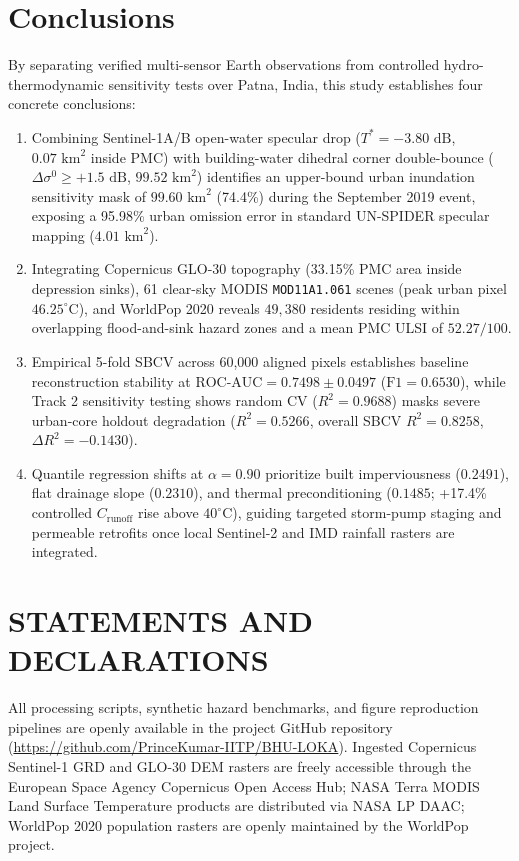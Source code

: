 \documentclass[OA,linenum]{InterPore}
\begin{document}
\section{Conclusions}

By separating verified multi-sensor Earth observations from controlled hydro-thermodynamic sensitivity tests over Patna, India, this study establishes four concrete conclusions:
\begin{enumerate}
    \item Combining Sentinel-1A/B open-water specular drop ($T^* = -3.80\text{ dB}$, $0.07\text{ km}^2$ inside PMC) with building-water dihedral corner double-bounce ($\Delta\sigma^0 \ge +1.5\text{ dB}$, $99.52\text{ km}^2$) identifies an upper-bound urban inundation sensitivity mask of $99.60\text{ km}^2$ (74.4\%) during the September 2019 event, exposing a 95.98\% urban omission error in standard UN-SPIDER specular mapping ($4.01\text{ km}^2$).
    \item Integrating Copernicus GLO-30 topography (33.15\% PMC area inside depression sinks), 61 clear-sky MODIS \texttt{MOD11A1.061} scenes (peak urban pixel $46.25^\circ\text{C}$), and WorldPop 2020 reveals $49,380$ residents residing within overlapping flood-and-sink hazard zones and a mean PMC ULSI of $52.27/100$.
    \item Empirical 5-fold SBCV across 60,000 aligned pixels establishes baseline reconstruction stability at $\text{ROC-AUC} = 0.7498 \pm 0.0497$ ($\text{F1} = 0.6530$), while Track 2 sensitivity testing shows random CV ($R^2 = 0.9688$) masks severe urban-core holdout degradation ($R^2 = 0.5266$, overall SBCV $R^2 = 0.8258$, $\Delta R^2 = -0.1430$).
    \item Quantile regression shifts at $\alpha = 0.90$ prioritize built imperviousness ($0.2491$), flat drainage slope ($0.2310$), and thermal preconditioning ($0.1485$; +17.4\% controlled $C_{\text{runoff}}$ rise above $40^\circ\text{C}$), guiding targeted storm-pump staging and permeable retrofits once local Sentinel-2 and IMD rainfall rasters are integrated.
\end{enumerate}

\section*{STATEMENTS AND DECLARATIONS}

\begin{datres}
All processing scripts, synthetic hazard benchmarks, and figure reproduction pipelines are openly available in the project GitHub repository (\url{https://github.com/PrinceKumar-IITP/BHU-LOKA}). Ingested Copernicus Sentinel-1 GRD and GLO-30 DEM rasters are freely accessible through the European Space Agency Copernicus Open Access Hub; NASA Terra MODIS Land Surface Temperature products are distributed via NASA LP DAAC; WorldPop 2020 population rasters are openly maintained by the WorldPop project.
\end{datres}
\end{document}
